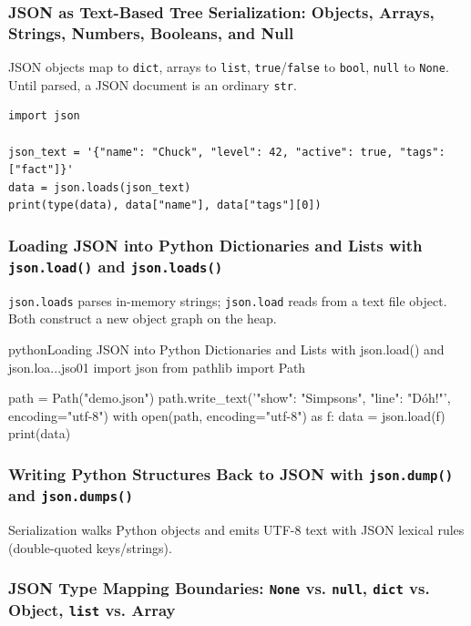\documentclass[a4paper,twoside]{report}
\begin{document}
\subsubsection{JSON as Text-Based Tree Serialization: Objects, Arrays, Strings, Numbers, Booleans, and Null}

JSON objects map to \texttt{dict}, arrays to \texttt{list}, \texttt{true}/\texttt{false} to \texttt{bool}, \texttt{null} to \texttt{None}. Until parsed, a JSON document is an ordinary \texttt{str}.

\begin{verbatim}
import json

json_text = '{"name": "Chuck", "level": 42, "active": true, "tags": ["fact"]}'
data = json.loads(json_text)
print(type(data), data["name"], data["tags"][0])
\end{verbatim}

\subsubsection{Loading JSON into Python Dictionaries and Lists with \texttt{json.load()} and \texttt{json.loads()}}

\texttt{json.loads} parses in-memory strings; \texttt{json.load} reads from a text file object. Both construct a new object graph on the heap.

\begin{codebox}[]{python}{Loading JSON into Python Dictionaries and Lists with json.load() and json.loa...}{jso01}
import json
from pathlib import Path

path = Path("demo.json")
path.write_text('{"show": "Simpsons", "line": "D\'oh!"}', encoding="utf-8")
with open(path, encoding="utf-8") as f:
    data = json.load(f)
print(data)
\end{codebox}


\subsubsection{Writing Python Structures Back to JSON with \texttt{json.dump()} and \texttt{json.dumps()}}

Serialization walks Python objects and emits UTF-8 text with JSON lexical rules (double-quoted keys/strings).

\subsubsection{JSON Type Mapping Boundaries: \texttt{None} vs. \texttt{null}, \texttt{dict} vs. Object, \texttt{list} vs. Array}
\end{document}
